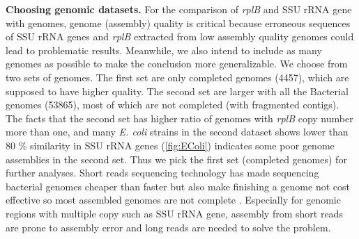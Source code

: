 \documentclass[]{msu-thesis}
\begin{document}
\textbf{Choosing genomic datasets. }
For the comparison of \textit{rplB} and SSU rRNA gene with genomes, genome (assembly) quality is critical because erroneous sequences of SSU rRNA genes and \textit{rplB} extracted from low assembly quality genomes could lead to problematic results. Meanwhile, we also intend to include as many genomes as possible to make the conclusion more generalizable. We choose from two sets of genomes. The first set are only completed genomes (4457), which are supposed to have higher quality. The second set are larger with all the Bacterial genomes (53865), most of which are not completed (with fragmented contigs). The facts that the second set has higher ratio of genomes with \textit{rplB} copy number more than one, and many \textit{E. coli} strains in the second dataset shows lower than 80 \% similarity in SSU rRNA genes (\cref{fig:EColi}) indicates some poor genome assemblies in the second set. Thus we pick the first set (completed genomes) for further analyses. Short reads sequencing technology has made sequencing bacterial genomes cheaper than faster but also make finishing a genome not cost effective so most assembled genomes are not complete \cite{land_insights_2015}. Especially for genomic regions with multiple copy such as SSU rRNA gene, assembly from short reads are prone to assembly error and long reads are needed to solve the problem.
\end{document}
